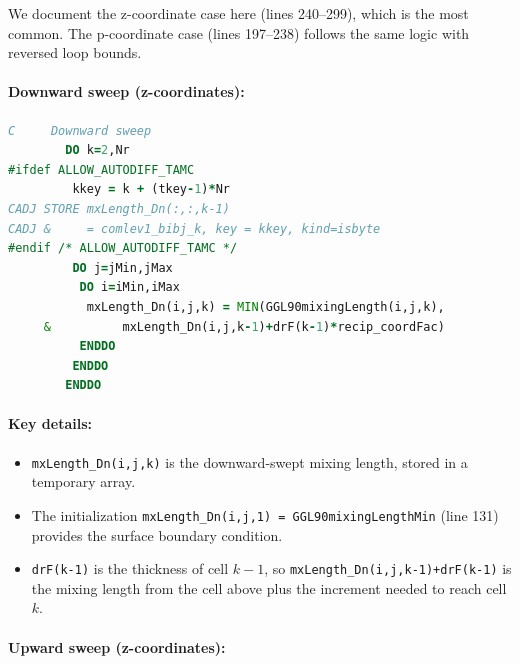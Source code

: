 \documentclass[12pt,letterpaper]{article}
\begin{document}
We document the z-coordinate case here (lines 240--299), which is the most common. The p-coordinate case (lines 197--238) follows the same logic with reversed loop bounds.

\paragraph{Downward sweep (z-coordinates):}

\begin{lstlisting}[language=Fortran,caption={(ggl90\_mixinglength.F:L245--258) Downward sweep in z-coordinates}]
C     Downward sweep
        DO k=2,Nr
#ifdef ALLOW_AUTODIFF_TAMC
         kkey = k + (tkey-1)*Nr
CADJ STORE mxLength_Dn(:,:,k-1)
CADJ &     = comlev1_bibj_k, key = kkey, kind=isbyte
#endif /* ALLOW_AUTODIFF_TAMC */
         DO j=jMin,jMax
          DO i=iMin,iMax
           mxLength_Dn(i,j,k) = MIN(GGL90mixingLength(i,j,k),
     &          mxLength_Dn(i,j,k-1)+drF(k-1)*recip_coordFac)
          ENDDO
         ENDDO
        ENDDO
\end{lstlisting}

\paragraph{Key details:}
\begin{itemize}
\item \verb|mxLength_Dn(i,j,k)| is the downward-swept mixing length, stored in a temporary array.
\item The initialization \verb|mxLength_Dn(i,j,1) = GGL90mixingLengthMin| (line 131) provides the surface boundary condition.
\item \verb|drF(k-1)| is the thickness of cell $k-1$, so \verb|mxLength_Dn(i,j,k-1)+drF(k-1)| is the mixing length from the cell above plus the increment needed to reach cell $k$.
\end{itemize}

\paragraph{Upward sweep (z-coordinates):}
\end{document}
